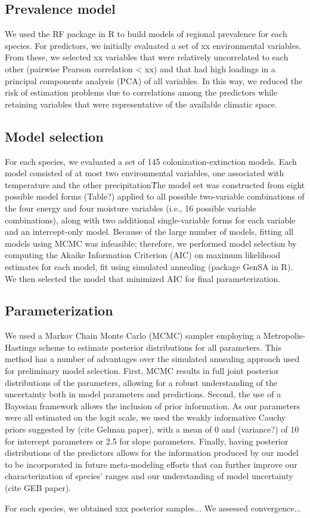 \documentclass[11pt]{article}
\begin{document}
\subsection*{Prevalence model}
We used the RF package in R to build models of regional prevalence for each species. 
For predictors, we initially evaluated a set of xx environmental variables. 
From these, we selected xx variables that were relatively uncorrelated to each other (pairwise Pearson correlation < xx) and that had high loadings in a principal components analysis (PCA) of all variables. 
In this way, we reduced the risk of estimation problems due to correlations among the predictors while retaining variables that were representative of the available climatic space.

\subsection*{Model selection}
For each species, we evaluated a set of 145 colonization-extinction models. 
Each model consisted of at most two environmental variables, one associated with temperature and the other precipitation\. 
The model set was constructed from eight possible model forms (Table?) applied to all possible two-variable combinations of the four energy and four moisture variables (i.e., 16 possible variable combinations), along with two additional single-variable forms for each variable and an intercept-only model. 
Because of the large number of models, fitting all models using MCMC was infeasible; therefore, we performed model selection by computing the Akaike Information Criterion (AIC) on maximum likelihood estimates for each model, fit using simulated annealing (package GenSA in R). 
We then selected the model that minimized AIC for final parameterization.

\subsection*{Parameterization}
We used a Markov Chain Monte Carlo (MCMC) sampler employing a Metropolis-Hastings scheme to estimate posterior distributions for all parameters.
This method has a number of advantages over the simulated annealing approach used for preliminary model selection.
First, MCMC results in full joint posterior distributions of the parameters, allowing for a robust understanding of the uncertainty both in model parameters and predictions.
Second, the use of a Bayesian framework allows the inclusion of prior information.
As our parameters were all estimated on the logit scale, we used the weakly informative Cauchy priors suggested by (cite Gelman paper), with a mean of 0 and (variance?) of 10 for intercept parameters or 2.5 for slope parameters.
Finally, having posterior distributions of the predictors allows for the information produced by our model to be incorporated in future meta-modeling efforts that can further improve our characterization of species' ranges and our understanding of model uncertainty (cite GEB paper).

For each species, we obtained xxx posterior samples...
We assessed convergence...

\renewcommand\refname{Literature Cited}
{}

\end{document}
